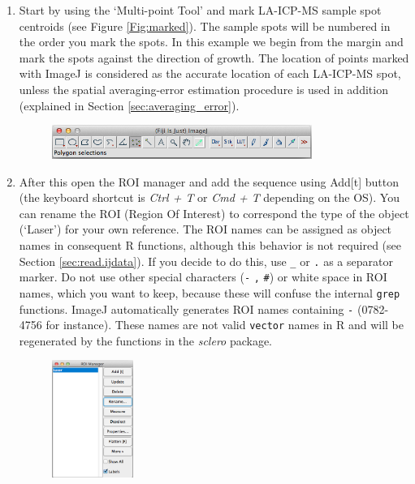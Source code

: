 \documentclass[11pt, a4paper]{article}
\newcommand{\sclero}{\textit{sclero}\xspace}
\begin{document}
\begin{enumerate}
\item Start by using the `Multi-point Tool' and mark LA-ICP-MS sample spot centroids (see Figure \ref{Fig:marked}). The sample spots will be numbered in the order you mark the spots. In this example we begin from the margin and mark the spots against the direction of growth. The location of points marked with ImageJ is considered as the accurate location of each LA-ICP-MS spot, unless the spatial averaging-error estimation procedure is used in addition (explained in Section \ref{sec:averaging_error}).
\begin{figure}[H]
\begin{center}
\includegraphics[width = 0.8\textwidth]{multi_point.png}
\end{center}
\end{figure}
\item After this open the ROI manager and add the sequence using Add[t] button (the keyboard shortcut is \textit{Ctrl + T} or \textit{Cmd + T} depending on the OS). You can rename the ROI (Region Of Interest) to correspond the type of the object (`Laser') for your own reference. The ROI names can be assigned as object names in consequent R functions, although this behavior is not required (see Section \ref{sec:read.ijdata}). If you decide to do this, use \texttt{\_} or \texttt{.} as a separator marker. Do not use other special characters (\texttt{-} \texttt{,} \texttt{\#}) or white space in ROI names, which you want to keep, because these will confuse the internal \texttt{grep} functions. ImageJ automatically generates ROI names containing \texttt{-} (0782-4756 for instance). These names are not valid \texttt{vector} names in R and will be regenerated by the functions in the \sclero package.
\begin{figure}[H]
\begin{center}
\includegraphics[width = 0.25\textwidth]{roi_manager.png}

\end{center}
\end{figure}
\end{enumerate}
\end{document}
